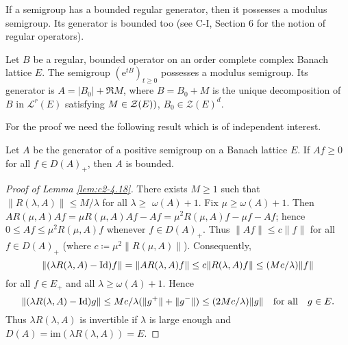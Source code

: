 If a semigroup has a bounded regular generator, then it possesses a modulus semigroup. Its generator is bounded too (see C-I, Section 6 for the notion of regular operators).

\begin{theorem}\label{thm:c2-4.17}
Let $B$ be a regular, bounded operator on an order complete complex Banach lattice $E$. The semigroup $(\mathrm{e}^{tB})_{t \geq 0}$ possesses a modulus semigroup. Its generator is $A = |B_{0}| + \Re M$, where $B = B_{0} + M$ is the unique decomposition of $B$ in $\mathcal{L}^{r}(E)$ satisfying $M \in \mathcal{Z}(E))$, $B_{0} \in \mathcal{Z}(E)^{d}$.
\end{theorem}

For the proof we need the following result which is of independent interest.

\begin{lemma}\label{lem:c2-4.18}
Let $A$ be the generator of a positive semigroup on a Banach lattice $E$. 
If $Af \geq 0$ for all $f \in D(A)_{+}$, then $A$ is bounded.
\end{lemma}
\begin{proof}[Proof of Lemma \ref{lem:c2-4.18}]
There exists $M \geq 1$ such that $\|R(\lambda,A)\| \leq M/\lambda$ for all $\lambda \geq$ $\omega(A)+1$.
Fix $\mu \geq \omega(A)+1$.
Then $AR(\mu,A)Af = \mu R(\mu,A)Af - Af = \mu^{2}R(\mu,A)f - \mu f - Af$; hence $0 \leq Af \leq \mu^{2}R(\mu,A)f$ whenever $f \in D(A)_{+}$.
Thus $\|Af\| \leq c\|f\|$ for all $f \in D(A)_{+}$ (where $c \coloneq \mu^{2}\|R(\mu,A)\|$).
Consequently,
\[
\|(\lambda R(\lambda,A) - \operatorname{Id})f\| = \|AR(\lambda,A)f\| \leq c\|R(\lambda,A)f\| \leq (Mc/\lambda)\|f\| 
\]
for all $f \in E_{+}$ and all $ \lambda \geq \omega(A)+1$. 
Hence
\[
\|(\lambda R(\lambda,A) - \operatorname{Id})g\| \leq Mc/\lambda(\|g^{+}\| + \|g^{-}\|) \leq (2Mc/\lambda)\|g\| \quad \text{for all} \quad g \in E.
\]
Thus $\lambda R(\lambda,A)$ is invertible if $\lambda$ is large enough and
$D(A) = \text{im}(\lambda R(\lambda,A)) = E$.
\end{proof}
